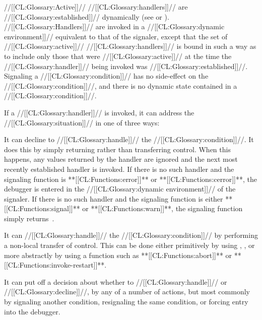 //[[CL:Glossary:Active]]// //[[CL:Glossary:handlers]]// are //[[CL:Glossary:established]]// dynamically
(see  or ).
//[[CL:Glossary:Handlers]]// are invoked in a //[[CL:Glossary:dynamic environment]]// 
equivalent to that of the signaler,
except that the set of //[[CL:Glossary:active]]// //[[CL:Glossary:handlers]]// 
is bound in such a way as to include only those that were //[[CL:Glossary:active]]// 
at the time the //[[CL:Glossary:handler]]// being invoked was //[[CL:Glossary:established]]//.
Signaling a //[[CL:Glossary:condition]]// has no side-effect on the //[[CL:Glossary:condition]]//, 
and there is no dynamic state contained in a //[[CL:Glossary:condition]]//.
 
If a //[[CL:Glossary:handler]]// is invoked, it can address the //[[CL:Glossary:situation]]// 
in one of three ways:
 
\beginlist
{}

It can decline to //[[CL:Glossary:handle]]// the //[[CL:Glossary:condition]]//.  It does this by
simply returning rather than transferring control.
When this happens, any values returned by the handler are
ignored and the next most recently established handler is invoked.
If there is no such handler and the signaling function is **[[CL:Functions:error]]**
or **[[CL:Functions:cerror]]**, the debugger is entered in the
//[[CL:Glossary:dynamic environment]]// of the signaler. If there is no such
handler and the signaling function is either **[[CL:Functions:signal]]** or
**[[CL:Functions:warn]]**, the signaling function simply returns~\nil.

 
It can //[[CL:Glossary:handle]]// the //[[CL:Glossary:condition]]// by performing a non-local
transfer of control.  This can be done either primitively by using
, ,  or more
abstractly by using a function such as **[[CL:Functions:abort]]** or
**[[CL:Functions:invoke-restart]]**.

 
It can put off a decision about whether to //[[CL:Glossary:handle]]// or //[[CL:Glossary:decline]]//,
by any of a number of actions, but most commonly by 
    signaling another condition,
    resignaling the same condition,
 or forcing entry into the debugger.

\endlist





